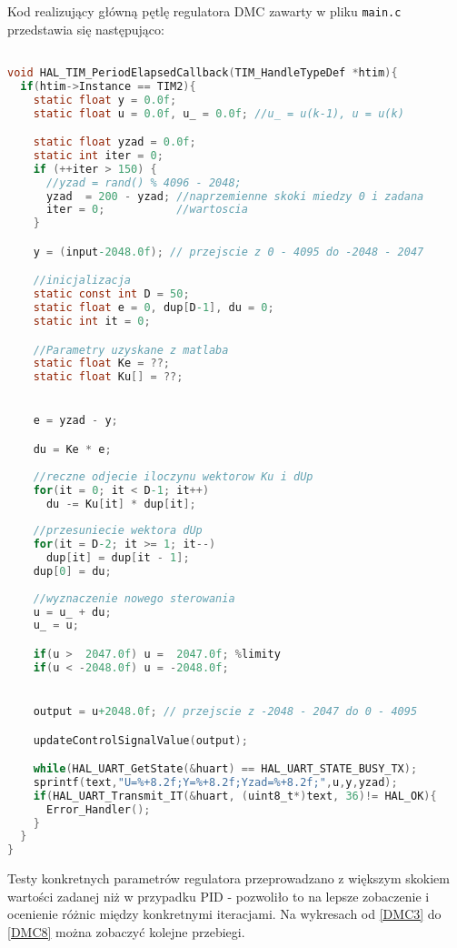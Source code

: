 Kod realizujący główną pętlę regulatora DMC zawarty w pliku \verb|main.c| przedstawia się następująco:

\begin{lstlisting}[language=C]

void HAL_TIM_PeriodElapsedCallback(TIM_HandleTypeDef *htim){
  if(htim->Instance == TIM2){
    static float y = 0.0f;
    static float u = 0.0f, u_ = 0.0f; //u_ = u(k-1), u = u(k)

    static float yzad = 0.0f;
    static int iter = 0;
    if (++iter > 150) {
      //yzad = rand() % 4096 - 2048;
      yzad  = 200 - yzad; //naprzemienne skoki miedzy 0 i zadana
      iter = 0;           //wartoscia
    }

    y = (input-2048.0f); // przejscie z 0 - 4095 do -2048 - 2047

	//inicjalizacja
    static const int D = 50;
    static float e = 0, dup[D-1], du = 0; 
    static int it = 0;

    //Parametry uzyskane z matlaba
    static float Ke = ??;
    static float Ku[] = ??;


    e = yzad - y;

    du = Ke * e;
    
    //reczne odjecie iloczynu wektorow Ku i dUp
    for(it = 0; it < D-1; it++)
      du -= Ku[it] * dup[it];
	
	//przesuniecie wektora dUp
    for(it = D-2; it >= 1; it--)
      dup[it] = dup[it - 1];
    dup[0] = du;
	
	//wyznaczenie nowego sterowania
    u = u_ + du;
    u_ = u;

    if(u >  2047.0f) u =  2047.0f; %limity
    if(u < -2048.0f) u = -2048.0f;


    output = u+2048.0f; // przejscie z -2048 - 2047 do 0 - 4095

    updateControlSignalValue(output);

    while(HAL_UART_GetState(&huart) == HAL_UART_STATE_BUSY_TX);
    sprintf(text,"U=%+8.2f;Y=%+8.2f;Yzad=%+8.2f;",u,y,yzad);
    if(HAL_UART_Transmit_IT(&huart, (uint8_t*)text, 36)!= HAL_OK){
      Error_Handler();   
    }
  }
}
\end{lstlisting} 

Testy konkretnych parametrów regulatora przeprowadzano z większym skokiem wartości zadanej niż w przypadku PID - pozwoliło to na lepsze zobaczenie i ocenienie różnic między konkretnymi iteracjami. Na wykresach od \ref{DMC3} do \ref{DMC8} można zobaczyć kolejne przebiegi.

